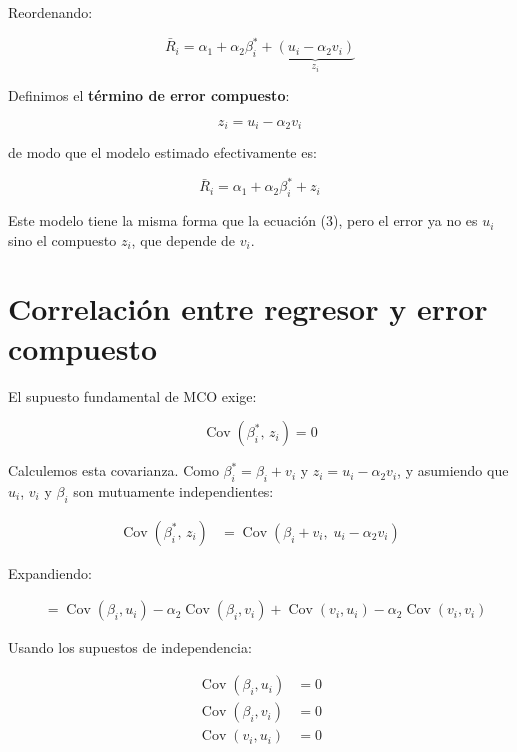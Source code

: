 \documentclass[12pt,letterpaper]{article}
\newcommand{\Cov}{\operatorname{Cov}}
\begin{document}
Reordenando:

\begin{equation}
\bar{R}_{i}
= \alpha_{1} + \alpha_{2}\beta_{i}^{*}
  + \underbrace{(u_{i} - \alpha_{2} v_{i})}_{z_{i}}
\end{equation}

Definimos el \textbf{término de error compuesto}:

\begin{equation}
z_{i} = u_{i} - \alpha_{2} v_{i}
\end{equation}

de modo que el modelo estimado efectivamente es:

\begin{equation}
\bar{R}_{i} = \alpha_{1} + \alpha_{2}\beta_{i}^{*} + z_{i}
\end{equation}

Este modelo tiene la misma forma que la ecuación (3), pero el error
ya no es $u_{i}$ sino el compuesto $z_{i}$, que depende de $v_{i}$.

\section{Correlación entre regresor y error compuesto}

El supuesto fundamental de MCO exige:

\begin{equation}
\Cov(\beta_{i}^{*},\, z_{i}) = 0
\end{equation}

Calculemos esta covarianza. Como $\beta_{i}^{*} = \beta_{i} + v_{i}$
y $z_{i} = u_{i} - \alpha_{2} v_{i}$, y asumiendo que $u_{i}$,
$v_{i}$ y $\beta_{i}$ son mutuamente independientes:

\begin{align}
\Cov(\beta_{i}^{*},\, z_{i})
&= \Cov\!\left(\beta_{i} + v_{i},\; u_{i} - \alpha_{2} v_{i}\right)
\end{align}

Expandiendo:

\begin{align}
&= \Cov(\beta_{i}, u_{i})
  - \alpha_{2}\Cov(\beta_{i}, v_{i})
  + \Cov(v_{i}, u_{i})
  - \alpha_{2}\Cov(v_{i}, v_{i})
\end{align}

Usando los supuestos de independencia:

\begin{align}
\Cov(\beta_{i}, u_{i}) &= 0 \\
\Cov(\beta_{i}, v_{i}) &= 0 \\
\Cov(v_{i}, u_{i})     &= 0
\end{align}
\end{document}
